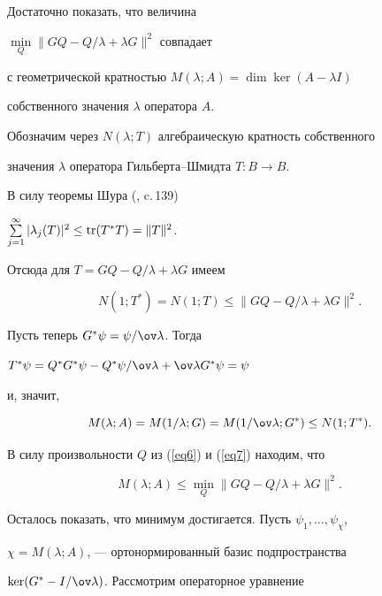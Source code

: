 \begin{pf}


Достаточно показать, что величина


$\min\limits_Q \|GQ-Q/\lambda+\lambda G\|^2$ совпадает 


с геометрической кратностью $M(\lambda;A)=\dim\ker(A-\lambda I)$ 


собственного значения $\lambda$ оператора $A$. 


Обозначим через $N(\lambda;T)$ алгебраическую кратность собственного


значения $\lambda$ оператора Гильберта--Шмидта $T:B\to B$. 


В силу теоремы Шура (\cite{b2}, c.\,139) 


$\sum\limits_{j=1}^\infty |\lambda_j(T)|^2


\le\tr (T^*T)=\|T\|^2$. 


Отсюда для $T=GQ-Q/\lambda+\lambda G$ имеем


\begin{equation}\label{eq6}


N(1;T^*)=N(1;T)\le\|GQ-Q/\lambda+\lambda G\|^2.


\end{equation}


Пусть теперь $G^*\psi=\psi/\ov\lambda$. Тогда 


$T^*\psi=Q^*G^*\psi-Q^*\psi/\ov\lambda +\ov\lambda G^*\psi=\psi$


и, значит,


\begin{equation}\label{eq7}


M(\lambda;A)=M(1/\lambda;G)=M(1/\ov\lambda;G^*)\le N(1;T^*).


\end{equation}


В силу произвольности $Q$ из (\ref{eq6}) и (\ref{eq7}) находим, что


$$


M(\lambda;A)\le\min_Q \|GQ-Q/\lambda+\lambda G\|^2.


$$





Осталось показать, что минимум достигается. Пусть $\psi_1,\dotsc,\psi_\chi$,


$\chi=M(\lambda;A)$, --- ортонормированный базис подпространства 


$\ker(G^*-I/\ov\lambda)$. Рассмотрим операторное уравнение


\begin{equation}\label{eq8}



\end{equation}
\end{pf}
